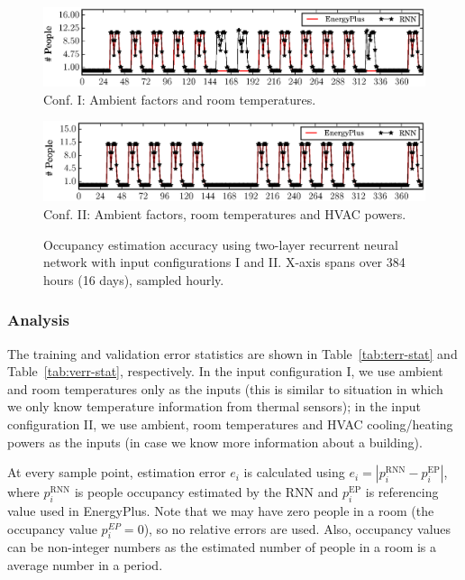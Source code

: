 \begin{figure}[h]

\begin{minipage}{\textwidth}
\centering\includegraphics[width=5in]{figs/results/2LRoomTOnlyDPFAugW3-4}
Conf. I: Ambient factors and room temperatures.
\end{minipage}
\hfill

\vspace{3ex}

\noindent\begin{minipage}{\textwidth}
\centering\includegraphics[width=5in]{figs/results/2LAmbHVACDPFAugW3-4}
Conf. II: Ambient factors, room temperatures and HVAC powers.
\end{minipage}
\hfill
\caption{\textcolor{feb18rev}{Occupancy estimation accuracy using two-layer recurrent neural network
    with input configurations I and II. X-axis spans over
    384 hours (16 days), sampled hourly.}}\label{fig:two-layer}
\end{figure}


\subsubsection{Analysis}
The training and validation error statistics are shown in
Table~\ref{tab:terr-stat} and Table~\ref{tab:verr-stat}, respectively.
In the input configuration I, we use ambient and room temperatures
only as the inputs (this is similar to situation in which we only know
temperature information from thermal sensors); in the input
configuration II, we use ambient, room temperatures and HVAC
cooling/heating powers as the inputs (in case we know more information
about a building).

At every sample point, estimation error $e_i$ is calculated using
$e_i=\left|p_i^{\text{RNN}}-p_i^{\text{EP}}\right|$, where
$p_i^{\text{RNN}}$ is people occupancy estimated by the RNN and
$p_i^{\text{EP}}$ is referencing value used in EnergyPlus. Note that we may
have zero people in a room (the occupancy value $p_i^{EP} = 0$), so
no relative errors are used. Also, occupancy values can be
non-integer numbers as the estimated number of people in a room is a
average number in a period.

